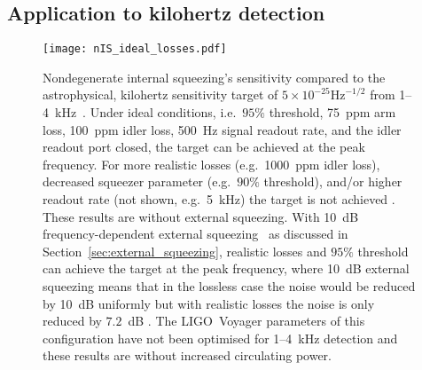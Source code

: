 \subsection{Application to kilohertz detection}
\label{sec:nIS_kHz}

\begin{figure}
    \centering
    \texttt{[image: nIS\_ideal\_losses.pdf]}
    \caption{   Nondegenerate internal squeezing's sensitivity compared to the astrophysical, kilohertz sensitivity target of $5\times10^{-25}\text{Hz}^{-1/2}$ from 1--4~kHz~\cite{miaoDesignGravitationalWaveDetectors2018}. Under ideal conditions, i.e.\ $95\%$ threshold, 75~ppm arm loss, 100~ppm idler loss, 500~Hz signal readout rate, and the idler readout port closed, the target can be achieved at the peak frequency. For more realistic losses (e.g.\ 1000~ppm idler loss), decreased squeezer parameter (e.g.\ $90\%$ threshold), and/or higher readout rate (not shown, e.g.\ 5~kHz) the target is not achieved . These results are without external squeezing. With 10~dB frequency-dependent external squeezing~\cite{} as discussed in Section~\ref{sec:external_squeezing}, realistic losses and $95\%$ threshold can achieve the target at the peak frequency, where 10~dB external squeezing means that in the lossless case the noise would be reduced by 10~dB uniformly but with realistic losses the noise is only reduced by $7.2$~dB .
    The LIGO~Voyager parameters of this configuration have not been optimised for 1--4~kHz detection and these results are without increased circulating power.}
    \label{fig:nIS_sens_target}
\end{figure}

